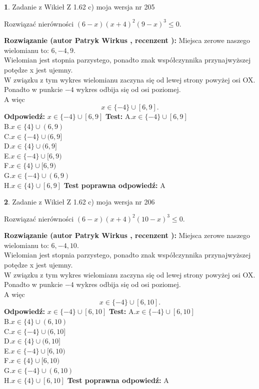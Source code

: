 \documentclass[12pt, a4paper]{article}
\theoremstyle{definition} %
\newtheorem{zad}{}
\newcommand{\zadStart}[1]{\begin{zad}#1\newline}
\newcommand{\zadStop}{\end{zad}}
\newcommand{\rozwStart}[2]{\noindent \textbf{Rozwiązanie (autor #1 , recenzent #2): }\newline}
\newcommand{\rozwStop}{\newline}
\newcommand{\odpStart}{\noindent \textbf{Odpowiedź:}\newline}
\newcommand{\odpStop}{\newline}
\newcommand{\testStart}{\noindent \textbf{Test:}\newline}
\newcommand{\testStop}{\newline}
\newcommand{\kluczStart}{\noindent \textbf{Test poprawna odpowiedź:}\newline}
\newcommand{\kluczStop}{\newline}
\begin{document}
\zadStart{Zadanie z Wikieł Z 1.62 c) moja wersja nr 205}

Rozwiązać nierówności $(6-x)(x+4)^{2}(9-x)^{3}\le0$.
\zadStop
\rozwStart{Patryk Wirkus}{}
Miejsca zerowe naszego wielomianu to: $6, -4, 9$.\\
Wielomian jest stopnia parzystego, ponadto znak współczynnika przy\linebreak najwyższej potędze x jest ujemny.\\ W związku z tym wykres wielomianu zaczyna się od lewej strony powyżej osi OX.\\
Ponadto w punkcie $-4$ wykres odbija się od osi poziomej.\\
A więc $$x \in \{-4\} \cup [6,9].$$
\rozwStop
\odpStart
$x \in \{-4\} \cup [6,9]$
\odpStop
\testStart
A.$x \in \{-4\} \cup [6,9]$\\
B.$x \in \{4\} \cup (6,9)$\\
C.$x \in \{-4\} \cup (6,9]$\\
D.$x \in \{4\} \cup (6,9]$\\
E.$x \in \{-4\} \cup [6,9)$\\
F.$x \in \{4\} \cup [6,9)$\\
G.$x \in \{-4\} \cup (6,9)$\\
H.$x \in \{4\} \cup [6,9]$
\testStop
\kluczStart
A
\kluczStop



\zadStart{Zadanie z Wikieł Z 1.62 c) moja wersja nr 206}

Rozwiązać nierówności $(6-x)(x+4)^{2}(10-x)^{3}\le0$.
\zadStop
\rozwStart{Patryk Wirkus}{}
Miejsca zerowe naszego wielomianu to: $6, -4, 10$.\\
Wielomian jest stopnia parzystego, ponadto znak współczynnika przy\linebreak najwyższej potędze x jest ujemny.\\ W związku z tym wykres wielomianu zaczyna się od lewej strony powyżej osi OX.\\
Ponadto w punkcie $-4$ wykres odbija się od osi poziomej.\\
A więc $$x \in \{-4\} \cup [6,10].$$
\rozwStop
\odpStart
$x \in \{-4\} \cup [6,10]$
\odpStop
\testStart
A.$x \in \{-4\} \cup [6,10]$\\
B.$x \in \{4\} \cup (6,10)$\\
C.$x \in \{-4\} \cup (6,10]$\\
D.$x \in \{4\} \cup (6,10]$\\
E.$x \in \{-4\} \cup [6,10)$\\
F.$x \in \{4\} \cup [6,10)$\\
G.$x \in \{-4\} \cup (6,10)$\\
H.$x \in \{4\} \cup [6,10]$
\testStop
\kluczStart
A
\kluczStop
\end{document}
